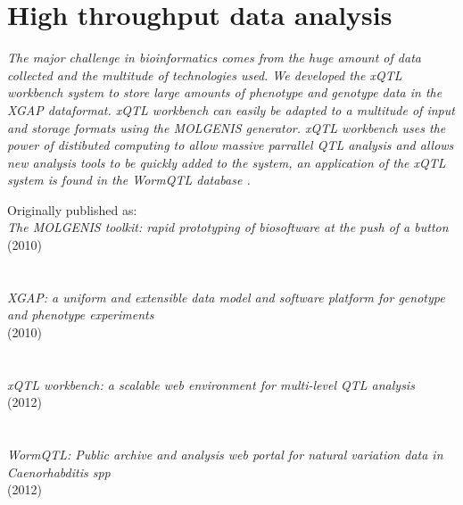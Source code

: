 \chapter{High throughput data analysis}
\label{chap:xqtlwormbench}

\emph{The major challenge in bioinformatics comes from the huge amount of data collected and the 
multitude of technologies used. We developed the xQTL workbench system\cite{Arends:2012} to store 
large amounts of phenotype and genotype data in the XGAP \cite{Swertz:2010a} dataformat. xQTL 
workbench can easily be adapted to a multitude of input and storage formats using the MOLGENIS 
\cite{Swertz:2004} generator. xQTL workbench uses the power of distibuted computing to allow 
massive parrallel QTL analysis and allows new analysis tools to be quickly added to the system, 
an application of the xQTL system is found in the WormQTL database \cite{Snoek:2012}.}

\null
\vfill

\begin{myexampleblock}{Originally published as:}
  \\
  \emph{The MOLGENIS toolkit: rapid prototyping of biosoftware at the push of a button}\\
   (2010)\\\\

  \\
  \emph{XGAP: a uniform and extensible data model and software platform for genotype and phenotype experiments}\\
   (2010)\\\\

  \\
  \emph{xQTL workbench: a scalable web environment for multi-level QTL analysis}\\
   (2012)\\\\

  \\
  \emph{WormQTL: Public archive and analysis web portal for natural variation data in Caenorhabditis spp}\\
   (2012)
\end{myexampleblock}

